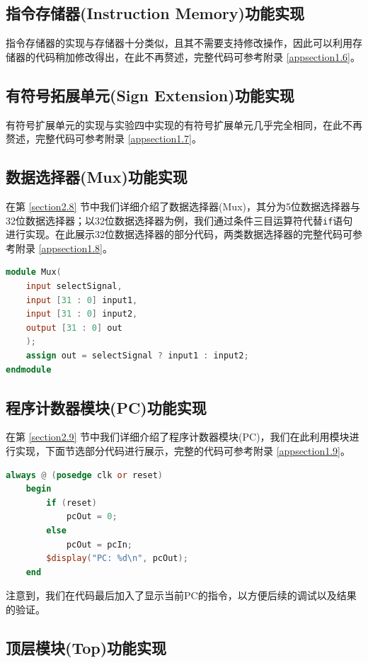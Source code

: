 \documentclass{cumcm}
\numberwithin{equation}{section}
\numberwithin{equation}{subsection}
\begin{document}
\subsection{指令存储器(Instruction Memory)功能实现}\label{section3.6}
指令存储器的实现与存储器十分类似，且其不需要支持修改操作，因此可以利用存储器的代码稍加修改得出，在此不再赘述，完整代码可参考附录 \ref{appsection1.6}。

\subsection{有符号拓展单元(Sign Extension)功能实现}\label{section3.7}
有符号扩展单元的实现与实验四中实现的有符号扩展单元几乎完全相同，在此不再赘述，完整代码可参考附录 \ref{appsection1.7}。

\subsection{数据选择器(Mux)功能实现}\label{section3.8}
在第 \ref{section2.8} 节中我们详细介绍了数据选择器(Mux)，其分为5位数据选择器与32位数据选择器；以32位数据选择器为例，我们通过条件三目运算符代替\texttt{if}语句进行实现。在此展示32位数据选择器的部分代码，两类数据选择器的完整代码可参考附录 \ref{appsection1.8}。
\begin{lstlisting}[language=verilog]
module Mux(
    input selectSignal,
    input [31 : 0] input1,
    input [31 : 0] input2,
    output [31 : 0] out
    );
    assign out = selectSignal ? input1 : input2;
endmodule
\end{lstlisting}

\subsection{程序计数器模块(PC)功能实现}\label{section3.9}
在第 \ref{section2.9} 节中我们详细介绍了程序计数器模块(PC)，我们在此利用模块进行实现，下面节选部分代码进行展示，完整的代码可参考附录 \ref{appsection1.9}。
\begin{lstlisting}[language=verilog]
always @ (posedge clk or reset)
    begin
        if (reset)
            pcOut = 0;
        else
            pcOut = pcIn;
        $display("PC: %d\n", pcOut);
    end
\end{lstlisting}

注意到，我们在代码最后加入了显示当前PC的指令，以方便后续的调试以及结果的验证。

\subsection{顶层模块(Top)功能实现}\label{section3.10}
\end{document}
